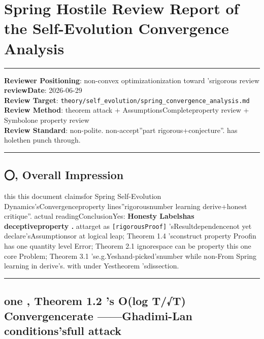 \documentclass[
  12pt,
]{article}
\author{SCX}
\date{2026}
\begin{document}
\section{Spring
Hostile Review Report of the Self-Evolution Convergence Analysis}\label{spring-ux81eaux8fdbux5316ux6536ux655bux5206ux6790ux7684ux654cux5bf9ux5ba1ux7a3fux62a5ux544a}

\begin{center}\rule{0.5\linewidth}{0.5pt}\end{center}

\textbf{Reviewer Positioning}: non-convex optimizationization toward 'srigorous review\\
\textbf{reviewDate}: 2026-06-29\\
\textbf{Review Target}:
\texttt{theory/self\_evolution/spring\_convergence\_analysis.md}\\
\textbf{Review Method}: theorem attack + AssumptionsCompleteproperty review + Symbolone property review\\
\textbf{Review Standard}: non-polite. non-accept''part rigorous+conjecture''. has holethen punch through. 

\begin{center}\rule{0.5\linewidth}{0.5pt}\end{center}

\subsection{〇, Overall Impression}\label{ux603bux4f53ux5370ux8c61}

this this document claimsfor  Spring
Self-Evolution Dynamics'sConvergenceproperty lines''rigorousnumber learning derive+honest critique''. actual readingConclusionYes: \textbf{Honesty Labelshas deceptiveproperty . }
attarget as  \texttt{{[}rigorousProof{]}}
'sResultdependencenot yet declare'sAssumptionsor at logical leap; Theorem 1.4
'sconstruct property Proofin has one quantity level Error; Theorem 2.1
ignorespace can be property this one core Problem; Theorem 3.1 'se.g.Yeshand-picked'snumber while non-From
Spring learning in derive's. with under Yestheorem 'sdissection. 

\begin{center}\rule{0.5\linewidth}{0.5pt}\end{center}

\subsection{one , Theorem 1.2 's O(log T/√T) Convergencerate ------Ghadimi-Lan
conditions'sfull attack}\label{ux4e00theorem-1.2-ux7684-olog-tt-ux6536ux655bux7387ghadimi-lan-ux6761ux4ef6ux7684ux5168ux9762ux653bux51fb}
\end{document}
